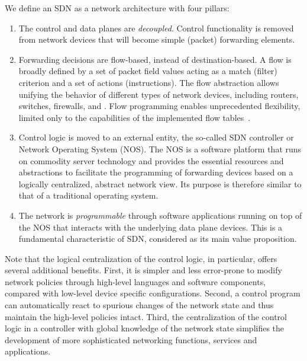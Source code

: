 We define an SDN as a network archi\-te\-cture with four pillars:\\
\begin{enumerate}
\item  The control and data planes are \textit{decoupled}. Control functionality is 
removed from network devices that will become simple (packet) forwarding elements.
\item  Forwarding decisions are flow-based, instead of des\-ti\-na\-tion-based. A flow is 
broadly defined by a set of packet field values acting as a match (filter) criterion 
and a set of actions (instructions).
The flow abstraction allows unifying the behavior of 
different types of network devices, including routers, switches, firewalls, and . 
Flow programming enables unprecedented flexibility, limited only to the capabilities of 
the implemented flow tables~\cite{mckeown2008}. 
\item Control logic is moved to an external entity, the so-called SDN controller or Network 
Operating System (NOS). The NOS is a software platform that runs on commodity server technology 
and provides the essential resources and abstractions to facilitate the programming of forwarding 
devices based on a logically centralized, abstract network view. Its purpose is therefore similar 
to that of a traditional operating system.
\item The network is \textit{programmable} through software applications running on top of the NOS that 
interacts with the underlying data plane devices. This is a fundamental characteristic of SDN, considered 
as its main value proposition.
\end{enumerate}

Note that the logical centralization of the control logic, in particular, offers several 
additional benefits.  First, it is simpler and less error-prone to modify network policies 
through high-level languages and software components, compared with low-level device specific
configurations. Second, a control program can automatically react to spurious changes of the 
network state and thus maintain the high-level policies intact. Third, the centralization of 
the control logic in a controller with global knowledge of the network state simplifies the
development of more sophisticated networking functions, services and applications.

